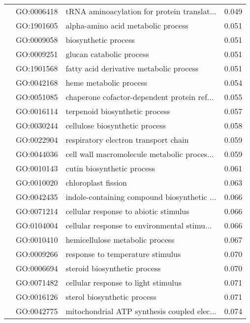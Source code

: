 \begin{longtable}{lllr}
   & GO:0006418 &  tRNA aminoacylation for protein translat... &         0.049 \\
   & GO:1901605 &           alpha-amino acid metabolic process &         0.051 \\
   & GO:0009058 &                         biosynthetic process &         0.051 \\
   & GO:0009251 &                     glucan catabolic process &         0.051 \\
   & GO:1901568 &      fatty acid derivative metabolic process &         0.051 \\
   & GO:0042168 &                       heme metabolic process &         0.054 \\
   & GO:0051085 &  chaperone cofactor-dependent protein ref... &         0.055 \\
   & GO:0016114 &               terpenoid biosynthetic process &         0.057 \\
   & GO:0030244 &               cellulose biosynthetic process &         0.058 \\
   & GO:0022904 &         respiratory electron transport chain &         0.059 \\
   & GO:0044036 &  cell wall macromolecule metabolic proces... &         0.059 \\
   & GO:0010143 &                   cutin biosynthetic process &         0.061 \\
   & GO:0010020 &                          chloroplast fission &         0.063 \\
   & GO:0042435 &  indole-containing compound biosynthetic ... &         0.066 \\
   & GO:0071214 &        cellular response to abiotic stimulus &         0.066 \\
   & GO:0104004 &  cellular response to environmental stimu... &         0.066 \\
   & GO:0010410 &              hemicellulose metabolic process &         0.067 \\
   & GO:0009266 &             response to temperature stimulus &         0.070 \\
   & GO:0006694 &                 steroid biosynthetic process &         0.070 \\
   & GO:0071482 &          cellular response to light stimulus &         0.071 \\
   & GO:0016126 &                  sterol biosynthetic process &         0.071 \\
   & GO:0042775 &  mitochondrial ATP synthesis coupled elec... &         0.074 \\

\end{longtable}
